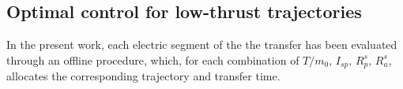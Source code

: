 
\subsection{Optimal control for low-thrust trajectories}
\label{optimalcontrollt2o}
%
%
%
%
%
%
%
%
In the present work, each electric segment of the the transfer has been evaluated through an offline procedure, which, for each combination of $T/m_0,\,I_{sp},\,R_p^s,\,R_a^s$, allocates the corresponding trajectory and transfer time.


